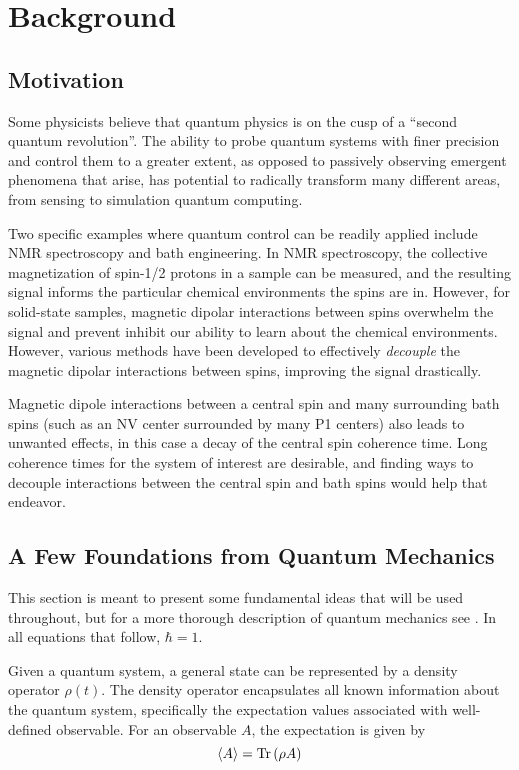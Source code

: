 \chapter{Background}

\section{Motivation}

Some physicists believe that quantum physics is on the cusp of a ``second quantum revolution''.\cite{quantum-rev} The ability to probe quantum systems with finer precision and control them to a greater extent, as opposed to passively observing emergent phenomena that arise, has potential to radically transform many different areas, from sensing to simulation quantum computing.

Two specific examples where quantum control can be readily applied include NMR spectroscopy and bath engineering. In NMR spectroscopy, the collective magnetization of spin-1/2 protons in a sample can be measured, and the resulting signal informs the particular chemical environments the spins are in. However, for solid-state samples, magnetic dipolar interactions between spins overwhelm the signal and prevent inhibit our ability to learn about the chemical environments. However, various methods have been developed to effectively \emph{decouple} the magnetic dipolar interactions between spins, improving the signal drastically.

Magnetic dipole interactions between a central spin and many surrounding bath spins (such as an NV center surrounded by many P1 centers) also leads to unwanted effects, in this case a decay of the central spin coherence time. Long coherence times for the system of interest are desirable, and finding ways to decouple interactions between the central spin and bath spins would help that endeavor.

\section{A Few Foundations from Quantum Mechanics}

This section is meant to present some fundamental ideas that will be used throughout, but for a more thorough description of quantum mechanics see
.
In all equations that follow, $\hbar = 1$.

Given a quantum system, a general state can be represented by a density operator $\rho(t)$. The density operator encapsulates all known information about the quantum system, specifically the expectation values associated with well-defined observable. For an observable $A$, the expectation is given by
\begin{equation}\label{eq:measure}
    \langle A \rangle = \text{Tr}\left( \rho A \right)
\end{equation}

